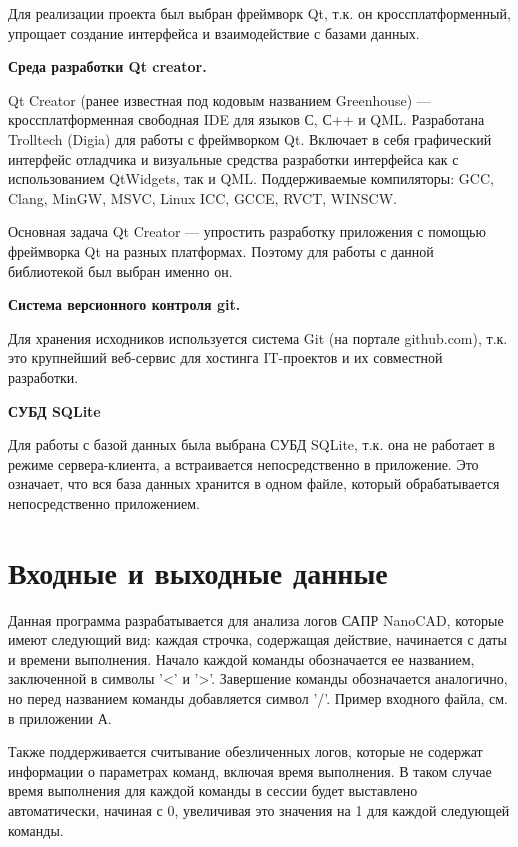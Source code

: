 
Для реализации проекта был выбран фреймворк Qt, т.к. он кроссплатформенный, упрощает создание интерфейса и взаимодействие с базами данных.

\newpage
\noindent\textbf{Среда разработки Qt creator.}

Qt Creator (ранее известная под кодовым названием Greenhouse) — кроссплатформенная свободная IDE для языков С, С++ и QML. Разработана Trolltech (Digia) для работы с фреймворком Qt. Включает в себя графический интерфейс отладчика и визуальные средства разработки интерфейса как с использованием QtWidgets, так и QML. Поддерживаемые компиляторы: GCC, Clang, MinGW, MSVC, Linux ICC, GCCE, RVCT, WINSCW.

Основная задача Qt Creator — упростить разработку приложения с помощью фреймворка Qt на разных платформах. Поэтому для работы с данной библиотекой был выбран именно он.

\noindent\textbf{Система версионного контроля git.}

Для хранения исходников используется система Git (на портале github.com), т.к. это крупнейший веб-сервис для хостинга IT-проектов и их совместной разработки. %

\noindent\textbf{СУБД SQLite}

Для работы с базой данных была выбрана СУБД SQLite, т.к. она не работает в режиме сервера-клиента, а встраивается непосредственно в приложение. Это означает, что вся база данных хранится в одном файле, который обрабатывается непосредственно приложением.

\section{Входные и выходные данные}
Данная программа разрабатывается для анализа логов САПР NanoCAD, которые имеют следующий вид: каждая строчка, содержащая действие, начинается с даты и времени выполнения. Начало каждой команды обозначается ее названием, заключенной в символы '<' и '>'. Завершение команды обозначается аналогично, но перед названием команды добавляется символ '/'. Пример входного файла, см. в приложении А. 

Также поддерживается считывание обезличенных логов, которые не содержат информации о параметрах команд, включая время выполнения. В таком случае время выполнения для каждой команды в сессии будет выставлено автоматически, начиная с 0, увеличивая это значения на 1 для каждой следующей команды.

